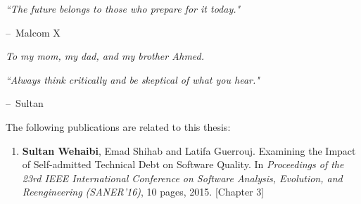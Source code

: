 \documentclass[12pt]{report}
\makeatletter
\newenvironment{chapquote}[2][2em]
{\setlength{\@tempdima}{#1}%
	\def\chapquote@author{#2}%
	\parshape 1 \@tempdima \dimexpr\textwidth-2\@tempdima\relax%
	\itshape}
{\par\normalfont\hfill--\ \chapquote@author\hspace*{\@tempdima}\par\bigskip}
\makeatother
\begin{document}
\begin{acknowledgments}
\begin{chapquote}{Malcom X}
	``The future belongs to those who prepare for it today."
\end{chapquote}

	
\end{acknowledgments}




\begin{dedication}
	\begin{flushright}
	\textit{To my mom, my dad, and my brother Ahmed.}
	\end{flushright}

\end{dedication}


\begin{thought}
\vspace*{\fill}
\begin{center}
	\begin{minipage}{.8\textwidth}
			\begin{chapquote}{Sultan}
			``Always think critically and be skeptical of what you hear." 
		\end{chapquote}
	\end{minipage}
\end{center}
\vfill 
\end{thought}

\begin{publications}

The following publications are related to this thesis:

\begin{enumerate}

\item \textbf{Sultan Wehaibi}, Emad Shihab and Latifa Guerrouj. Examining the Impact of Self-admitted Technical Debt on Software Quality. In \textit{Proceedings of the 23rd IEEE International Conference on Software Analysis, Evolution, and Reengineering (SANER’16)}, 10 pages, 2015. [Chapter 3]


\end{enumerate}

\end{publications}
\end{document}
